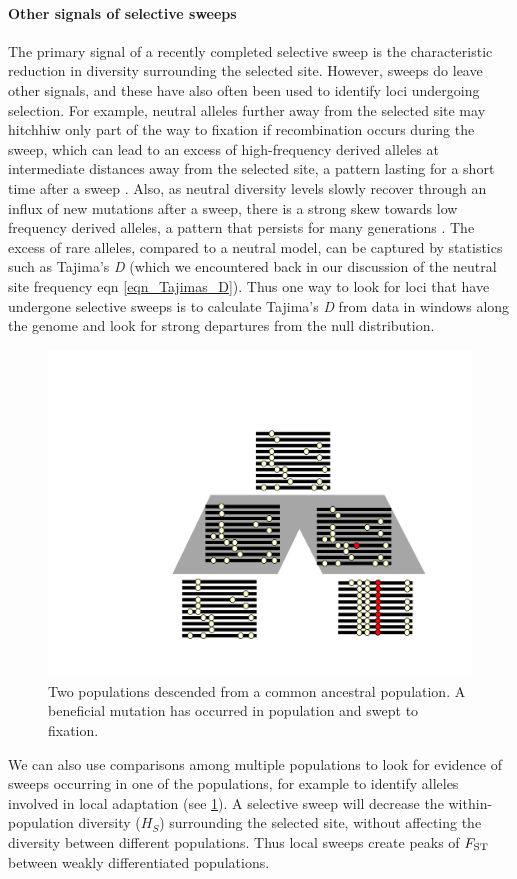 \paragraph{Other signals of selective sweeps}
The primary signal of a recently completed selective sweep is the
characteristic reduction in diversity surrounding the selected site.
However, sweeps do leave other signals, and these have also often been
used to identify loci undergoing selection. 
For example, neutral alleles further away from the selected site may
hitchhiw only part of the way to fixation if recombination occurs during
the sweep, which can lead to an excess of high-frequency
derived alleles at intermediate distances away from the selected site,
a pattern lasting for a short time after a sweep \citep{Fay:00,Przeworski:02,Kim:06}.
Also, as neutral diversity levels slowly recover through an influx of
new mutations after a sweep, there is a strong skew towards low
frequency derived alleles, a pattern that persists for many
generations \citep{Braverman:95, Przeworski:02,Kim:06}. The excess of
rare alleles, compared to a neutral model, can be captured by
statistics such as Tajima's {\it D} (which
we encountered back in our discussion of the neutral site frequency eqn
\ref{eqn_Tajimas_D}). Thus one way to look for loci that have
undergone selective sweeps is to calculate Tajima's {\it D} from data in
windows along the genome and look for
strong departures from the null distribution.

\begin{figure}
\begin{center}
\includegraphics[width=0.5 \textwidth]{figures/Hitchhiking/two_pops_sweep.pdf}
\end{center}
\caption{Two populations descended from a common ancestral
  population. A beneficial mutation has occurred in population and
  swept to fixation.} \label{fig:local_sweep_haps}
\end{figure}

We can also use comparisons among multiple populations to look for evidence of sweeps occurring in one of the
populations, for example to identify alleles involved in local adaptation (see \ref{fig:local_sweep_haps}). A selective sweep will decrease the within-population diversity ($H_S$)
surrounding the selected site, without affecting the diversity between different
populations. Thus local sweeps create peaks of
$F_{\mathrm{ST}}$ between weakly differentiated populations. 

